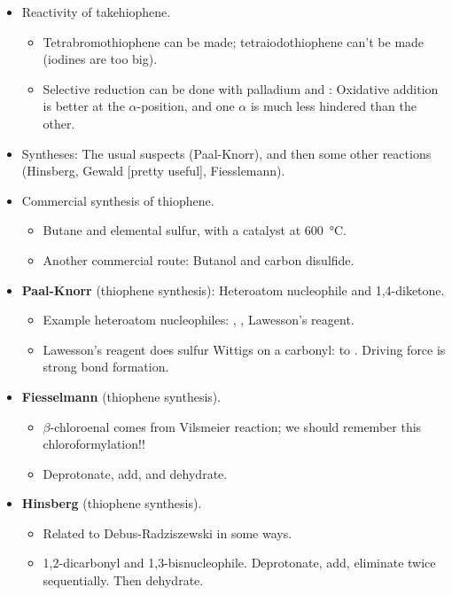 \documentclass[../notes.tex]{subfiles}
\begin{document}
\begin{itemize}
    \item Reactivity of takehiophene.
    \begin{itemize}
        \item Tetrabromothiophene can be made; tetraiodothiophene can't be made (iodines are too big).
        \item Selective reduction can be done with palladium and : Oxidative addition is better at the $\alpha$-position, and one $\alpha$ is much less hindered than the other.
    \end{itemize}
    \item Syntheses: The usual suspects (Paal-Knorr), and then some other reactions (Hinsberg, Gewald [pretty useful], Fiesslemann).
    \item Commercial synthesis of thiophene.
    \begin{itemize}
        \item Butane and elemental sulfur, with a catalyst at \SI{600}{\celsius}.
        \item Another commercial route: Butanol and carbon disulfide.
    \end{itemize}
    \pagebreak
    \item \textbf{Paal-Knorr} (thiophene synthesis): Heteroatom nucleophile and 1,4-diketone.
    \begin{itemize}
        \item Example heteroatom nucleophiles: , , Lawesson's reagent.
        \item Lawesson's reagent does sulfur Wittigs on a carbonyl:  to . Driving force is strong  bond formation.
    \end{itemize}
    \item \textbf{Fiesselmann} (thiophene synthesis).
    \begin{itemize}
        \item $\beta$-chloroenal comes from Vilsmeier reaction; we should remember this chloroformylation!!
        \item Deprotonate, add, and dehydrate.
    \end{itemize}
    \item \textbf{Hinsberg} (thiophene synthesis).
    \begin{itemize}
        \item Related to Debus-Radziszewski in some ways.
        \item 1,2-dicarbonyl and 1,3-bisnucleophile. Deprotonate, add, eliminate twice sequentially. Then dehydrate.

\end{itemize}
\end{itemize}
\end{document}
